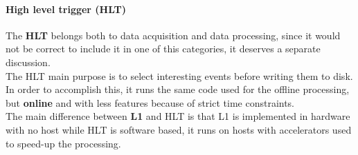 \paragraph{High level trigger (HLT)}
The \textbf{HLT} belongs both to data acquisition and data processing, since it would not be correct to include it in one of this categories, it deserves a separate discussion. \\
The HLT main purpose is to select interesting events before writing them to disk. In order to accomplish this, it runs the same code used for the offline processing, but \textbf{online} and with less features because of strict time constraints. \\
The main difference between \textbf{L1} and HLT is that L1 is implemented in hardware with no host while HLT is software based, it runs on hosts with accelerators used to speed-up the processing.
